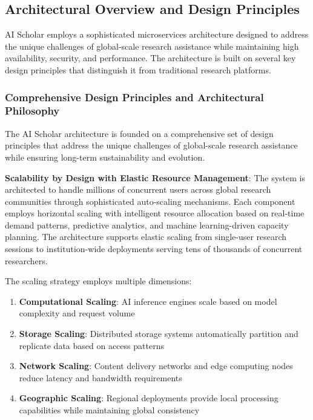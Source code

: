 \documentclass[10pt,twocolumn]{article}
\begin{document}
\subsection{Architectural Overview and Design Principles}

AI Scholar employs a sophisticated microservices architecture designed to address the unique challenges of global-scale research assistance while maintaining high availability, security, and performance. The architecture is built on several key design principles that distinguish it from traditional research platforms.

\subsubsection{Comprehensive Design Principles and Architectural Philosophy}

The AI Scholar architecture is founded on a comprehensive set of design principles that address the unique challenges of global-scale research assistance while ensuring long-term sustainability and evolution.

\textbf{Scalability by Design with Elastic Resource Management}: The system is architected to handle millions of concurrent users across global research communities through sophisticated auto-scaling mechanisms. Each component employs horizontal scaling with intelligent resource allocation based on real-time demand patterns, predictive analytics, and machine learning-driven capacity planning. The architecture supports elastic scaling from single-user research sessions to institution-wide deployments serving tens of thousands of concurrent researchers.

The scaling strategy employs multiple dimensions:
\begin{enumerate}
    \item \textbf{Computational Scaling}: AI inference engines scale based on model complexity and request volume
    \item \textbf{Storage Scaling}: Distributed storage systems automatically partition and replicate data based on access patterns
    \item \textbf{Network Scaling}: Content delivery networks and edge computing nodes reduce latency and bandwidth requirements
    \item \textbf{Geographic Scaling}: Regional deployments provide local processing capabilities while maintaining global consistency
\end{enumerate}
\end{document}
